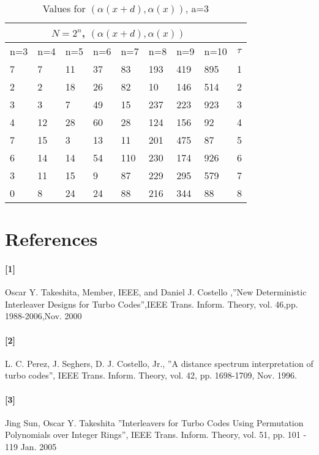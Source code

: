\documentclass[20 pts]{article}
\begin{document}
\begin{table}[h!]
\centering
\begin{tabular}{ |p{0.7cm}|p{0.7cm}|p{0.7cm}|p{0.7cm}|p{0.7cm}|p{0.7cm}|p{0.7cm} |p{0.7cm}||p{0.7cm} |}
 \hline
 \multicolumn{8}{|c|}{$N=2^n$, $(\alpha(x+d),\alpha(x))$} \\
 \hline
n=3&n=4&n=5&n=6&n=7&n=8&n=9&n=10&$\tau$\\
 \hline
   7  &   7   & 11   & 37   & 83  & 193   &419  & 895  &   1\\
   2  &   2  &  18   & 26   & 82  &  10 &  146 &  514  &   2\\
   3 &    3  &   7  &  49  &  15 &  237 &  223 &  923 &    3\\
   4  &  12  &  28 &   60 &   28&   124 &  156 &   92  &   4\\
   7  &  15 &    3 &   13  &  11 &  201 &  475 &   87  &   5\\
   6   & 14   & 14  &  54 &  110 &  230 &  174 &  926 &    6\\
   3  &  11   & 15  &   9  &  87  & 229  & 295 &  579   &  7\\
  0   &  8   & 24   & 24   & 88  & 216 &  344 &   88  &   8\\

 \hline
\end{tabular}
\caption{Values for $(\alpha(x+d),\alpha(x))$, a=3}
\label{table:3}
\end{table}



\newpage
\section{References}
\paragraph{[1]}  Oscar Y. Takeshita, Member, IEEE, and Daniel J. Costello ,''New Deterministic Interleaver Designs for Turbo Codes'',IEEE Trans. Inform. Theory, vol.  46,pp. 1988-2006,Nov. 2000\\
\paragraph{[2]}  L. C. Perez, J. Seghers, D. J. Costello, Jr., ''A distance spectrum interpretation of turbo codes'', IEEE Trans. Inform. Theory, vol. 42, pp. 1698-1709, Nov. 1996.\\
\paragraph{[3]} Jing Sun, Oscar Y. Takeshita ”Interleavers for Turbo Codes Using Permutation Polynomials over Integer Rings”, IEEE Trans. Inform. Theory, vol. 51,
pp. 101 - 119 Jan. 2005
\end{document}
